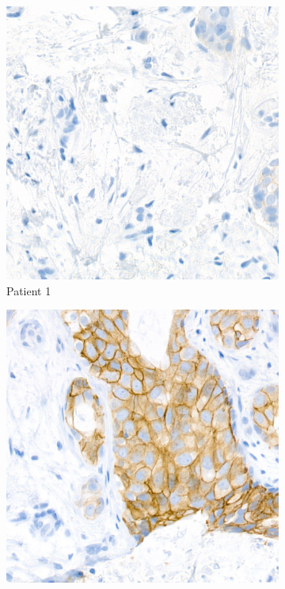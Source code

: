 \begin{figure}[H]
    \centering
    \begin{subfigure}[b]{0.24\textwidth}
    \includegraphics[width=\textwidth]{imgs/data/p1.png}
    \caption{Patient 1}
  \end{subfigure}
  \hfill
  \begin{subfigure}[b]{0.24\textwidth}
    \includegraphics[width=\textwidth]{imgs/data/p2.png}

\end{subfigure}
\end{figure}
